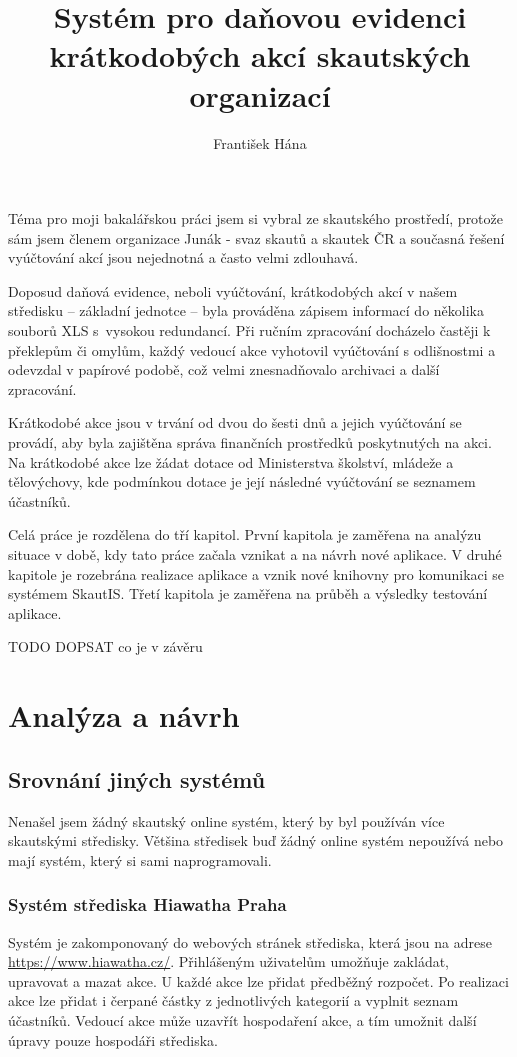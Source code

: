 \documentclass[thesis=B,czech]{FITthesis}[2011/06/14]
\title{Systém pro daňovou evidenci krátkodobých akcí skautských organizací}
\author{František Hána} %
\begin{document}

\begin{introduction}
Téma pro moji bakalářskou práci jsem si vybral ze skautského prostředí, protože sám jsem členem organizace Junák - svaz skautů a skautek ČR a současná řešení vyúčtování akcí jsou nejednotná a často velmi zdlouhavá.

Doposud daňová evidence, neboli vyúčtování, krátkodobých akcí v našem středisku -- základní jednotce -- byla prováděna zápisem informací do několika souborů XLS s~vysokou redundancí. Při ručním zpracování docházelo častěji k překlepům či omylům, každý vedoucí akce vyhotovil vyúčtování s odlišnostmi a odevzdal v papírové podobě, což velmi znesnadňovalo archivaci a další zpracování. 

Krátkodobé akce jsou v trvání od dvou do šesti dnů a jejich vyúčtování se provádí, aby byla zajištěna správa finančních prostředků poskytnutých na akci. Na krátkodobé akce lze žádat dotace od Ministerstva školství, mládeže a tělovýchovy, kde podmínkou dotace je její následné vyúčtování se seznamem účastníků.

Celá práce je rozdělena do tří kapitol. První kapitola je zaměřena na analýzu situace v době, kdy tato práce začala vznikat a na návrh nové aplikace. V druhé kapitole je rozebrána realizace aplikace a vznik nové knihovny pro komunikaci se systémem SkautIS. Třetí kapitola je zaměřena na průběh a výsledky testování aplikace. 



TODO DOPSAT co je v závěru 


\end{introduction}

\chapter{Analýza a návrh}
\section{Srovnání jiných systémů}
Nenašel jsem žádný skautský online systém, který by byl používán více skautskými středisky. Většina středisek buď žádný online systém nepoužívá nebo mají systém, který si sami naprogramovali.

\subsection{Systém střediska Hiawatha Praha}
Systém je zakomponovaný do webových stránek střediska, která jsou na adrese \url{https://www.hiawatha.cz/}. Přihlášeným uživatelům umožňuje zakládat, upravovat a mazat akce. U každé akce lze přidat předběžný rozpočet. Po realizaci akce lze přidat i čerpané částky z jednotlivých kategorií a vyplnit seznam účastníků. Vedoucí akce může uzavřít hospodaření akce, a tím umožnit další úpravy pouze hospodáři střediska.
\end{document}
